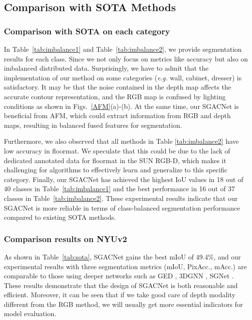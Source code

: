 \documentclass[journal,twoside,web]{ieeecolor}
\begin{document}
\subsection{Comparison with SOTA Methods}
\subsubsection{Comparison with SOTA on each category}
In Table~\ref{tab:imbalance1} and Table~\ref{tab:imbalance2}, we provide segmentation results for each class. Since we not only focus on metrics like accuracy but also on imbalanced distributed data. Surprisingly, we have to admit that the implementation of our method on some categories (\textit{e.g.} wall, cabinet, dresser) is satisfactory. It may be that the noise contained in the depth map affects the accurate contour representation, and the RGB map is confused by lighting conditions as shown in Figs.~\ref{AFM}(a)-(b). At the same time, our SGACNet is beneficial from AFM, which could extract information from RGB and depth maps, resulting in balanced fused features for segmentation. 

Furthermore, we also observed that all methods in Table \ref{tab:imbalance2} have low accuracy in floormat. We speculate that this could be due to the lack of dedicated annotated data for floormat in the SUN RGB-D, which makes it challenging for algorithms to effectively learn and generalize to this specific category. Finally, our SGACNet has achieved the highest IoU values in 18 out of 40 classes in Table~\ref{tab:imbalance1} and the best performance in 16 out of 37 classes in Table~\ref{tab:imbalance2}. These experimental results indicate that our SGACNet is more reliable in terms of class-balanced segmentation performance compared to existing SOTA methods.

\subsubsection{Comparison results on NYUv2}
As shown in Table~\ref{tab:sota}, SGACNet gains the best mIoU of 49.4$\%$, and our experimental results with three segmentation metrics (mIoU, PixAcc., mAcc.) are comparable to those using deeper networks such as GED \cite{GED}, 3DGNN \cite{3DGNN}, SGNet \cite{SGNet}. These results demonstrate that the design of SGACNet is both reasonable and efficient. Moreover, it can be seen that if we take good care of depth modality different from the RGB method, we will usually get more essential indicators for model evaluation. 
\end{document}
